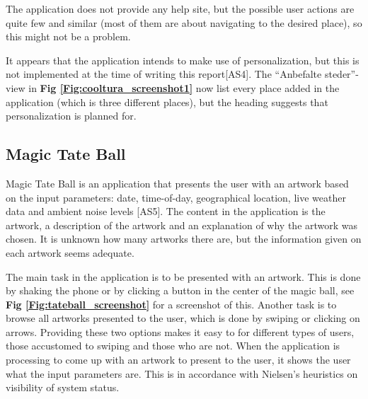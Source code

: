 The application does not provide any help site, but the possible user actions are quite few and similar (most of them are about navigating to the desired place), so this might not be a problem. \newline

It appears that the application intends to make use of personalization, but this is not implemented at the time of writing this report[AS4]. The “Anbefalte steder”-view in \textbf{Fig \ref{Fig:cooltura_screenshot1}} now list every place added in the application (which is three different places), but the heading suggests that personalization is planned for. 

\subsection{Magic Tate Ball}

Magic Tate Ball is an application that presents the user with an artwork based on the input parameters: date, time-of-day, geographical location, live weather data and ambient noise levels [AS5]. The content in the application is the artwork, a description of the artwork and an explanation of why the artwork was chosen. It is unknown how many artworks there are, but the information given on each artwork seems adequate. \newline

The main task in the application is to be presented with an artwork. This is done by shaking the phone or by clicking a button in the center of the magic ball, see \textbf{Fig \ref{Fig:tateball_screenshot}} for a screenshot of this. Another task is to browse all artworks presented to the user, which is done by swiping or clicking on arrows. Providing these two options makes it easy to for different types of users, those accustomed to swiping and those who are not. When the application is processing to come up with an artwork to present to the user, it shows the user what the input parameters are. This is in accordance with Nielsen’s heuristics on visibility of system status. \newline

